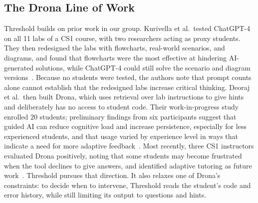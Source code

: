 \documentclass[manuscript,review]{acmart}
\begin{document}
\subsection{The Drona Line of Work}
Threshold builds on prior work in our group. Kurivella et al.\ tested ChatGPT-4 on all 11 labs of a CS1 course, with two researchers acting as proxy students. They then redesigned the labs with flowcharts, real-world scenarios, and diagrams, and found that flowcharts were the most effective at hindering AI-generated solutions, while ChatGPT-4 could still solve the scenario and diagram versions~\cite{kurivella2025designing}. Because no students were tested, the authors note that prompt counts alone cannot establish that the redesigned labs increase critical thinking. Deoraj et al.\ then built Drona, which uses retrieval over lab instructions to give hints and deliberately has no access to student code. Their work-in-progress study enrolled 20 students; preliminary findings from six participants suggest that guided AI can reduce cognitive load and increase persistence, especially for less experienced students, and that usage varied by experience level in ways that indicate a need for more adaptive feedback~\cite{deoraj2025guiding}. Most recently, three CS1 instructors evaluated Drona positively, noting that some students may become frustrated when the tool declines to give answers, and identified adaptive tutoring as future work~\cite{abdullahi2026instructors}. Threshold pursues that direction. It also relaxes one of Drona's constraints: to decide when to intervene, Threshold reads the student's code and error history, while still limiting its output to questions and hints.
\end{document}
